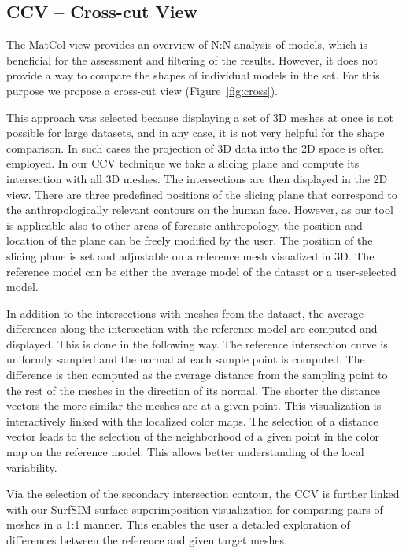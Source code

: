 \documentclass[final,5p,times]{elsarticle}
\begin{document}
\subsection{CCV -- Cross-cut View}
The MatCol view provides an overview of N:N analysis of models, which is beneficial for the assessment and filtering of the results. 
However, it does not provide a way to compare the shapes of individual models in the set.
For this purpose we propose a cross-cut view (Figure~\ref{fig:cross}).

This approach was selected because displaying a set of 3D meshes at once is not possible for large datasets, and in any case, it is not very helpful for the shape comparison. 
In such cases the projection of 3D data into the 2D space is often employed.
In our CCV technique we take a slicing plane and compute its intersection with all 3D meshes.
The intersections are then displayed in the 2D view.
There are three predefined positions of the slicing plane that correspond to the anthropologically relevant contours on the human face. 
However, as our tool is applicable also to other areas of forensic anthropology, the position and location of the plane can be freely modified by the user.
The position of the slicing plane is set and adjustable on a reference mesh visualized in 3D.
The reference model can be either the average model of the dataset or a user-selected model.

In addition to the intersections with meshes from the dataset, the average differences along the intersection with the reference model are computed and displayed.
This is done in the following way.
The reference intersection curve is uniformly sampled and the normal at each sample point is computed.
The difference is then computed as the average distance from the sampling point to the rest of the meshes in the direction of its normal.
The shorter the distance vectors the more similar the meshes are at a given point.
This visualization is interactively linked with the localized color maps.
The selection of a distance vector leads to the selection of the neighborhood of a given point in the color map on the reference model.
This allows better understanding of the local variability.

Via the selection of the secondary intersection contour, the CCV is further linked with our SurfSIM surface superimposition visualization for comparing pairs of meshes in a 1:1 manner. 
This enables the user a detailed exploration of differences between the reference and given target meshes. 
\end{document}
